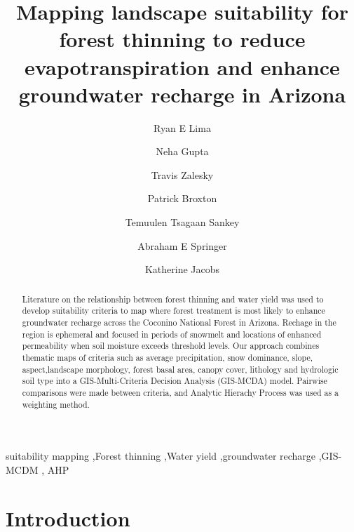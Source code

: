 \documentclass[
  number,
  preprint,
  3p,
  onecolumn]{elsarticle}
\begin{document}
\begin{frontmatter}
\title{Mapping landscape suitability for forest thinning to reduce
evapotranspiration and enhance groundwater recharge in Arizona}
\author[1]{Ryan E Lima%
%
}
\author[2]{Neha Gupta%
%
}

\author[2]{Travis Zalesky%
%
}

\author[2]{Patrick Broxton%
%
}

\author[1]{Temuulen Tsagaan Sankey%
%
}

\author[1]{Abraham E Springer%
%
}

\author[2]{Katherine Jacobs%
%
}










        
\begin{abstract}
Literature on the relationship between forest thinning and water yield
was used to develop suitability criteria to map where forest treatment
is most likely to enhance groundwater recharge across the Coconino
National Forest in Arizona. Rechage in the region is ephemeral and
focused in periods of snowmelt and locations of enhanced permeability
when soil moisture exceeds threshold levels. Our approach combines
thematic maps of criteria such as average precipitation, snow dominance,
slope, aspect,landscape morphology, forest basal area, canopy cover,
lithology and hydrologic soil type into a GIS-Multi-Criteria Decision
Analysis (GIS-MCDA) model. Pairwise comparisons were made between
criteria, and Analytic Hierachy Process was used as a weighting method.
\end{abstract}





\begin{keyword}
    suitability mapping \sep Forest thinning \sep Water
yield \sep groundwater recharge \sep GIS-MCDM \sep 
    AHP
\end{keyword}
\end{frontmatter}
    

\section{Introduction}\label{sec-intro}
\end{document}
